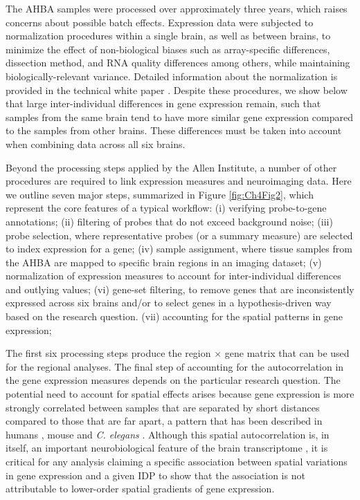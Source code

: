 The AHBA samples were processed over approximately three years, which raises concerns about possible batch effects. Expression data were subjected to normalization procedures within a single brain, as well as between brains, to minimize the effect of non-biological biases such as array-specific differences, dissection method, and RNA quality differences among others, while maintaining biologically-relevant variance. Detailed information about the normalization is provided in the technical white paper \citep{AHBAdoc}. Despite these procedures, we show below that large inter-individual differences in gene expression remain, such that samples from the same brain tend to have more similar gene expression compared to the samples from other brains. These differences must be taken into account when combining data across all six brains.

Beyond the processing steps applied by the Allen Institute, a number of other procedures are required to link expression measures and neuroimaging data. Here we outline seven major steps, summarized in Figure \ref{fig:Ch4Fig2}, which represent the core features of a typical workflow:
(i) verifying probe-to-gene annotations;
(ii) filtering of probes that do not exceed background noise;
(iii) probe selection, where representative probes (or a summary measure) are selected to index expression for a gene;
(iv) sample assignment, where tissue samples from the AHBA are mapped to specific brain regions in an imaging dataset;
(v) normalization of expression measures to account for inter-individual differences and outlying values;
(vi) gene-set filtering, to remove genes that are inconsistently expressed across six brains and/or to select genes in a hypothesis-driven way based on the research question.
(vii) accounting for the spatial patterns in gene expression;

The first six processing steps produce the region $\times$ gene matrix that can be used for the regional analyses.
The final step of accounting for the autocorrelation in the gene expression measures depends on the particular research question.
The potential need to account for spatial effects arises because gene expression is more strongly correlated between samples that are separated by short distances compared to those that are far apart, a pattern that has been described in humans
\citep{Richiardi2015,Krienen2016,Vertes2016b,Pantazatos2017}, mouse \citep{Fulcher2016} and \textit{C. elegans} \citep{Arnatkeviciute2018}.
Although this spatial autocorrelation is, in itself, an important neurobiological feature of the brain transcriptome \citep{Gryglewski2018, Fornito2019},
it is critical for any analysis claiming a specific association between spatial variations in gene expression and a given IDP to show that the association is not attributable to lower-order spatial gradients of gene expression.

